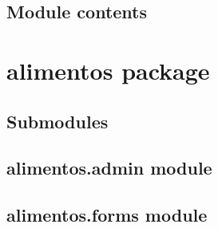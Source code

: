 \documentclass[letterpaper,10pt,english]{sphinxmanual}
\begin{document}
\subsection{Module contents}
\label{SIDGV:module-SIDGV}\label{SIDGV:module-contents}

\begin{fulllineitems}
\label{SIDGV:SIDGV.reverse_decorator}
\end{fulllineitems}



\section{alimentos package}
\label{alimentos:alimentos-package}\label{alimentos::doc}

\subsection{Submodules}
\label{alimentos:submodules}

\subsection{alimentos.admin module}
\label{alimentos:alimentos-admin-module}\label{alimentos:module-alimentos.admin}

\subsection{alimentos.forms module}
\label{alimentos:module-alimentos.forms}\label{alimentos:alimentos-forms-module}
\end{document}
